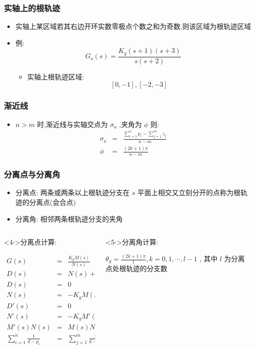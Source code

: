\documentclass{beamer}
\begin{document}
\begin{frame}
\frametitle{实轴上的根轨迹}
\label{sec-1-4}

\begin{itemize}
\item <2->实轴上某区域若其右边开环实数零极点个数之和为奇数,则该区域为根轨迹区域
\item <2->例:  
    \[G_o(s)=\frac{K_g(s+1)(s+3)}{s(s+2)}\]
\begin{itemize}
\item <3-> 实轴上根轨迹区域:  
            \[ [0,-1],[-2,-3] \]
\end{itemize}
\end{itemize}
\end{frame}
\begin{frame}
\frametitle{渐近线}
\label{sec-1-5}

\begin{itemize}
\item <2-> $n>m$ 时,渐近线与实轴交点为  $\sigma_a$  ,夹角为  $\phi$  则:
       \begin{eqnarray*}
       \sigma_a & = &\frac{\sum_{i=1}^n p_i -\sum_{j=1}^m z_j}{n-m} \\
       \phi &=& \frac{(2k+1)\pi}{n-m}
       \end{eqnarray*}
\end{itemize}
\end{frame}
\begin{frame}
\frametitle{分离点与分离角}
\label{sec-1-6}

\begin{itemize}
\item <2->分离点: 两条或两条以上根轨迹分支在  $s$  平面上相交又立刻分开的点称为根轨迹的分离点(会合点)
\item <3->分离角: 相邻两条根轨迹分支的夹角
\end{itemize}
\begin{columns}
\begin{column}{0.5\textwidth}
\begin{block}<4->{分离点计算:}
\label{sec-1-6-1}

\begin{eqnarray*}
G(s) & = & \frac{K_g M(s)}{N(s)}\\
D(s) &=& N(s)+K_g M(s) \\
D(s) &=& 0 \\
N(s) &=& - K_g M(s) \\
D'(s) &=& 0 \\
N'(s) &=& -K_g M'(s) \\
M'(s)N(s) &=&M(s)N'(s) \\
\sum_{i=1}^n\frac{1}{d-p_i} &=& \sum_{j=1}^m\frac{1}{d-z_j}
\end{eqnarray*}
\end{block}
\end{column}
\begin{column}{0.5\textwidth}
\begin{block}<5->{分离角计算:}
\label{sec-1-6-2}


$\theta_d = \frac{(2k+1)\pi}{l}, k=0,1,\cdots,l-1$ , 其中  $l$  为分离点处根轨迹的分支数
\end{block}
\end{column}
\end{columns}
\end{frame}
\end{document}
